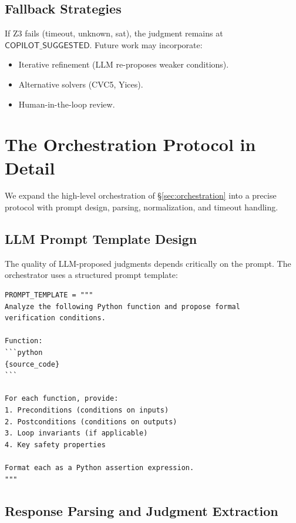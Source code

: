 \documentclass[11pt]{article}
\newcommand{\CopilotSugg}{\ensuremath{\mathsf{COPILOT\_SUGGESTED}}}
\begin{document}
\subsection{Fallback Strategies}
If Z3 fails (timeout, unknown, sat), the judgment remains at \CopilotSugg. 
Future work may incorporate:
\begin{itemize}[noitemsep]
  \item Iterative refinement (LLM re-proposes weaker conditions).
  \item Alternative solvers (CVC5, Yices).
  \item Human-in-the-loop review.
\end{itemize}

\section{The Orchestration Protocol in Detail}\label{sec:orch-detail}

We expand the high-level orchestration of \S\ref{sec:orchestration}
into a precise protocol with prompt design, parsing, normalization,
and timeout handling.

\subsection{LLM Prompt Template Design}

The quality of LLM-proposed judgments depends critically on the prompt.
The orchestrator uses a structured prompt template:

\begin{lstlisting}[style=jugeo-python]
PROMPT_TEMPLATE = """
Analyze the following Python function and propose formal
verification conditions.

Function:
```python
{source_code}
```

For each function, provide:
1. Preconditions (conditions on inputs)
2. Postconditions (conditions on outputs)
3. Loop invariants (if applicable)
4. Key safety properties

Format each as a Python assertion expression.
"""
\end{lstlisting}

\subsection{Response Parsing and Judgment Extraction}
\end{document}
